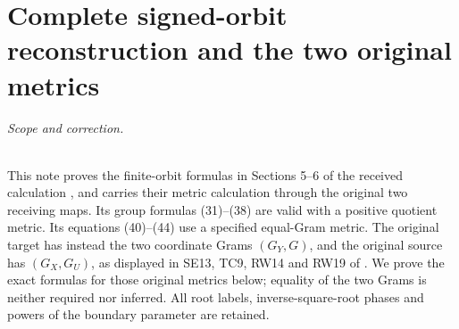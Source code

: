 \documentclass[11pt]{article}
\begin{document}
\endgroup

\clearpage\begingroup
\part*{Complete signed-orbit reconstruction and the two original metrics}
\newcommand{\sforbitC}{\mathbb C}
\newcommand{\sforbittr}{\operatorname{tr}}
\newcommand{\sforbitdiag}{\operatorname{diag}}
\newcommand{\sforbitsgn}{\operatorname{sgn}}
\newcommand{\sforbitrank}{\operatorname{rank}}
\newcommand{\sforbitim}{\operatorname{im}}
\newcommand{\sforbiteps}{\varepsilon}
\newcommand{\sforbitone}{\mathbf 1}



\paragraph{Scope and correction.}
This note proves the finite-orbit formulas in Sections 5--6 of the
received calculation \cite{sforbit:Incoming}, and carries their metric calculation
through the original two receiving maps.  Its group formulas (31)--(38)
are valid with a positive quotient metric.  Its equations (40)--(44)
use a specified equal-Gram metric.  The original target has instead
the two coordinate Grams $(G_Y,G)$, and the original source has
$(G_X,G_U)$, as displayed in SE13, TC9, RW14 and RW19 of \cite{sforbit:Fable}.
We prove the exact formulas for those original metrics below; equality
of the two Grams is neither required nor inferred.
All root labels, inverse-square-root phases and powers of the boundary
parameter are retained.
\end{document}
